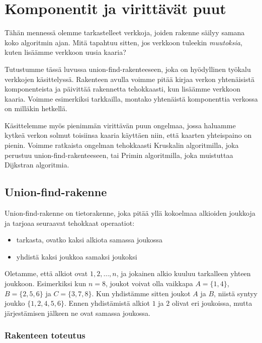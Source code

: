 \chapter{Komponentit ja virittävät puut}

Tähän mennessä olemme tarkastelleet verkkoja,
joiden rakenne säilyy samana koko algoritmin ajan.
Mitä tapahtuu sitten, jos verkkoon tuleekin \emph{muutoksia},
kuten lisäämme verkkoon uusia kaaria?

Tutustumme tässä luvussa union-find-rakenteeseen,
joka on hyödyl\-linen työkalu verkkojen käsittelyssä.
Rakenteen avulla voimme pitää kirjaa verkon yhtenäisistä
komponenteista ja päivittää rakennetta tehokkaasti,
kun lisäämme verkkoon kaaria.
Voimme esimerkiksi tarkkailla, montako yhte\-näistä
komponenttia verkossa on milläkin hetkellä.

Käsittelemme myös pienimmän virittävän puun ongelmaa,
jossa haluamme kytkeä verkon solmut toisiinsa kaaria käyttäen niin,
että kaarten yhteispaino on pienin.
Voimme ratkaista ongelman tehokkaasti Kruskalin algoritmilla,
joka perustuu union-find-rakenteeseen,
tai Primin algoritmilla, joka muistuttaa Dijkstran algoritmia.

\section{Union-find-rakenne}

Union-find-rakenne on tietorakenne, joka
pitää yllä kokoelmaa alkioiden joukkoja ja tarjoaa
seuraavat tehokkaat operaatiot:

\begin{itemize}
\item tarkasta, ovatko kaksi alkiota samassa joukossa
\item yhdistä kaksi joukkoa samaksi joukoksi
\end{itemize}

Oletamme, että alkiot ovat $1,2,\dots,n$,
ja jokainen alkio kuuluu tarkalleen yhteen joukkoon.
Esimerkiksi kun $n=8$, joukot voivat olla vaikkapa
$A=\{1,4\}$, $B=\{2,5,6\}$ ja $C=\{3,7,8\}$.
Kun yhdistämme sitten joukot $A$ ja $B$,
niistä syntyy joukko $\{1,2,4,5,6\}$.
Ennen yhdistämistä alkiot $1$ ja $2$ olivat eri joukoissa,
mutta järjestämisen jälkeen ne ovat samassa joukossa.

\subsection{Rakenteen toteutus}

